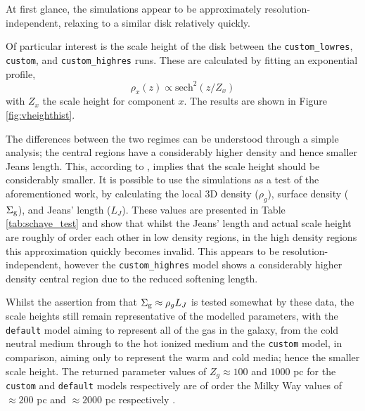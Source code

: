 At first glance, the simulations appear to be approximately resolution-independent, relaxing to a similar disk relatively quickly.

Of particular interest is the scale height of the disk between the {\tt custom\_lowres}, {\tt custom}, and {\tt custom\_highres} runs.
These are calculated by fitting an exponential profile,
\begin{equation}
    \rho_x(z) \propto \mathrm{sech}^2\left(z/Z_x\right)
    \label{eqn:vertprofile}
\end{equation}
with $Z_x$ the scale height for component $x$. The results are shown in Figure \ref{fig:vheighthist}.

The differences between the two regimes can be understood through a simple \citet{jeans_stability_1902} analysis; the central regions have a considerably higher density and hence smaller Jeans length.
This, according to \citet{schaye_model-independent_2001}, implies that the scale height should be considerably smaller.
It is possible to use the simulations as a test of the aforementioned work, by calculating the local 3D density ($\rho_g$), surface density ($\Sigma_\mathrm{g}$), and Jeans' length ($L_J$).
These values are presented in Table \ref{tab:schaye_test} and show that whilst the Jeans' length and actual scale height are roughly of order each other in low density regions, in the high density regions this approximation quickly becomes invalid.
This appears to be resolution-independent, however the {\tt custom\_highres} model shows a considerably higher density central region due to the reduced softening length.

Whilst the assertion from \citet{schaye_model-independent_2001} that $\Sigma_\mathrm{g} \approx \rho_g L_J$ is tested somewhat by these data, the scale heights still remain representative of the modelled parameters, with the {\tt default} model aiming to represent all of the gas in the galaxy, from the cold neutral medium through to the hot ionized medium and the {\tt custom} model, in comparison, aiming only to represent the warm and cold media; hence the smaller scale height.
The returned parameter values of $Z_g \approx 100$ and $1000$ pc for the {\tt custom} and {\tt default} models respectively are of order the Milky Way values of $\approx 200$ pc and $\approx 2000$ pc respectively \citep{mckee_stars_2015}.

